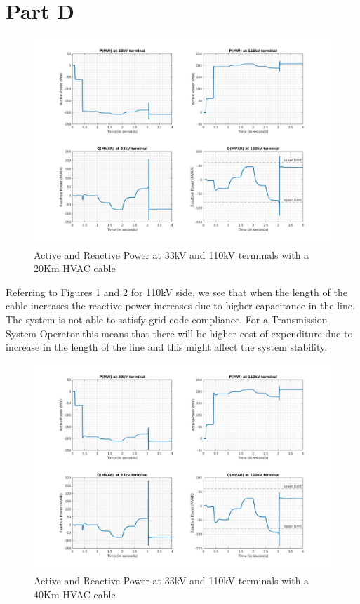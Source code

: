 \section*{Part D}
\begin{figure}[H]
    \centering
        \includegraphics[width=0.8 \linewidth]{images_a7/20km_line.jpg}
        \caption{Active and Reactive Power at 33kV and 110kV terminals with a 20Km HVAC cable}
        \label{fig:20km_line}   
\end{figure}
Referring to Figures \ref{fig:20km_line} and \ref{fig:40km_line} for 110kV side, we see that when the length of the cable increases the reactive power increases due to higher capacitance in the line. The system is not able to satisfy grid code compliance. For a Transmission System Operator this means that there will be higher cost of expenditure due to increase in the length of the line and this might affect the system stability. 
\begin{figure}[H]
    \centering
        \includegraphics[width=0.8 \linewidth]{images_a7/40km_line.jpg}
        \caption{Active and Reactive Power at 33kV and 110kV terminals with a 40Km HVAC cable}
        \label{fig:40km_line}   
\end{figure}
